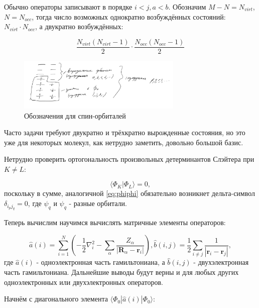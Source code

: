 \documentclass[12pt, oneside]{article}
\numberwithin{equation}{section}  %
\begin{document}
Обычно операторы записывают в порядке \(i < j, a < b\). Обозначим \(M - N = N_{virt}\), \(N = N_{occ}\), тогда число возможных однократно возбуждённых состояний: \(N_{virt} \cdot N_{occ}\), а двукратно возбуждённых:

\[
\frac{N_{virt}(N_{virt} - 1)}{2} \cdot \frac{N_{occ}(N_{occ} - 1)}{2}
\]

\begin{figure}
    \includegraphics[width=0.7\textwidth]{./images/spin-orbitals2.png}
    \caption{Обозначения для спин-орбиталей}
    \label{fig:spin-orbitals2}
\end{figure}

Часто задачи требуют двукратно и трёхкратно вырожденные состояния, но это уже для некоторых молекул, как нетрудно заметить, довольно большой базис. 


Нетрудно проверить ортогональность произвольных детерминантов Слэйтера при \(K \neq L\):

\[\langle \Phi_K | \Phi_L \rangle = 0,\]
поскольку в сумме, аналогичной \eqref{eq:phiphi} обязательно возникнет дельта-символ \(\delta_{i_{p}j_{q}} = 0\), где \(\psi_q\) и \(\psi_q\) - разные орбитали.

Теперь вычислим научимся вычислять матричные элементы операторов:

\begin{equation}
\hat{a}(i) = \sum_{i=1}^{N} \left(- \dfrac{1}{2} \nabla_i^2 - \sum_\alpha \dfrac{Z_\alpha}{|\bm{R}_\alpha - \bm{r}_i|}\right), \hat{b}(i, j) = \dfrac{1}{2} \sum_{i\neq j } \dfrac{1}{|\bm{r}_i - \bm{r}_j|},
\end{equation}
где \(\hat{a}(i)\) - одноэлектронная часть гамильтониана, а \(\hat{b}(i, j)\) - двухэлектронная часть гамильтониана. Дальнейшие выводы будут верны и для любых других одноэлектронных или двухэлектронных операторов.

Начнём с диагонального элемента \(\langle \Phi_0 | \hat{a}(i) | \Phi_0 \rangle\):
\end{document}
